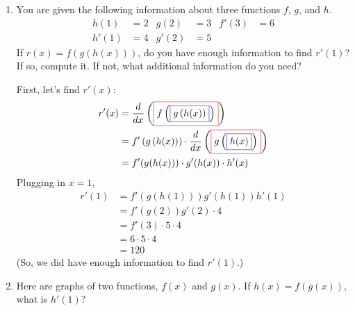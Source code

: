 \documentclass{article}
\begin{document}
\begin{enumerate}
\begin{enumerate}
  \end{enumerate}

  \item 
  \begin{problem}[\vfill]
    You are given the following information about three functions
    $f$, $g$, and $h$.
    \begin{align*}
      h(1) &= 2 & g(2) &= 3 & f'(3) &= 6 \\
      h'(1) &= 4 & g'(2) &= 5 
    \end{align*}
    If $r(x) = f(g(h(x)))$, do you have enough information to find
    $r'(1)$?  If so, compute it. If not, what additional information do
    you need?
  \end{problem}

  \begin{solution}
    First, let's find $r'(x)$:
    \begin{align*}
      r'(x) = {} & \frac{d}{dx}
      \left(\fcolorbox{red}{white}{$\displaystyle
          f\left(\fcolorbox{blue}{white}{$\displaystyle
              g\left(h(x)\right)$}\right)$}\right) \\
      = {} & f'\left(g\left(h(x)\right)\right)\cdot
      \frac{d}{dx} \left(\fcolorbox{red}{white}{$\displaystyle
          g\left(\fcolorbox{blue}{white}{$\displaystyle
              h(x)$}\right)$}\right) \\ 
      = {} & f'(g(h(x)))\cdot
      g'(h(x))\cdot h'(x)
    \end{align*}
    Plugging in $x = 1$, 
    \begin{align*}
      r'(1) &= f'(g(h(1))) g'(h(1)) h'(1) \\
      &= f'(g(2)) g'(2) \cdot 4 \\
      &= f'(3) \cdot 5 \cdot 4 \\
      &= 6 \cdot 5 \cdot 4 \\
      &= \boxed{120}
    \end{align*}
    (So, we did have enough information to find $r'(1)$.)
  \end{solution}


\item 

    
  \begin{problem}
    Here are graphs of two functions, $f(x)$ and $g(x)$.  If $h(x) =
    f(g(x))$, what is $h'(1)$?


\end{problem}
\end{enumerate}
\end{document}
